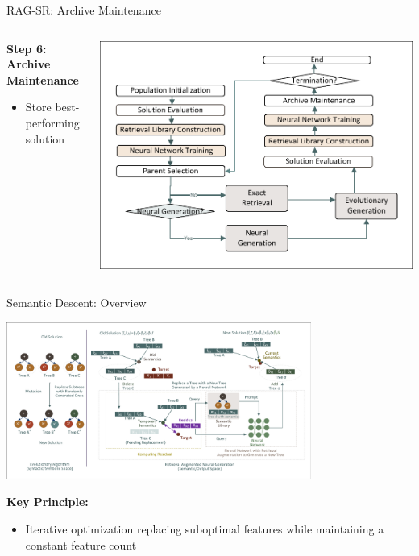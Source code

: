 \documentclass[aspectratio=1610]{beamer}
\begin{document}
    \begin{frame}{RAG-SR: Archive Maintenance}
        \begin{columns}
            \begin{column}{0.5\textwidth}
                \textbf{Step 6: Archive Maintenance}
                \begin{itemize}
                    \item Store best-performing solution
                \end{itemize}
            \end{column}
            \begin{column}{0.5\textwidth}
                \includegraphics[width=1.0\textwidth]{figs/Workflow.pdf}
            \end{column}
        \end{columns}
    \end{frame}

    \begin{frame}{Semantic Descent: Overview}
        \begin{center}
            \includegraphics[width=0.75\textwidth, trim=8pt 8pt 8pt 8pt, clip]{figs/Motivation.pdf}
        \end{center}

        \textbf{Key Principle:}
        \begin{itemize}
            \item Iterative optimization replacing suboptimal features while maintaining a constant feature count
        \end{itemize}
    \end{frame}
\end{document}
